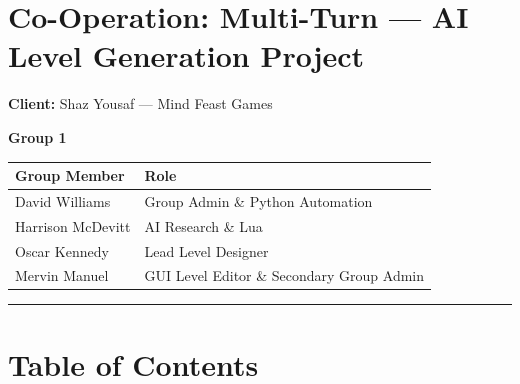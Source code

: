 \section{Co-Operation: Multi-Turn --- AI Level Generation
Project}\label{co-operation-multi-turn-ai-level-generation-project}

\textbf{Client:} Shaz Yousaf --- Mind Feast Games

\textbf{Group 1}

\begin{longtable}[]{@{}ll@{}}
\toprule\noalign{}
Group Member & Role \\
\midrule\noalign{}
\endhead
\bottomrule\noalign{}
\endlastfoot
David Williams & Group Admin \& Python Automation \\
Harrison McDevitt & AI Research \& Lua \\
Oscar Kennedy & Lead Level Designer \\
Mervin Manuel & GUI Level Editor \& Secondary Group Admin \\
\end{longtable}

\begin{center}\rule{0.5\linewidth}{0.5pt}\end{center}

\section{Table of Contents}\label{table-of-contents}

